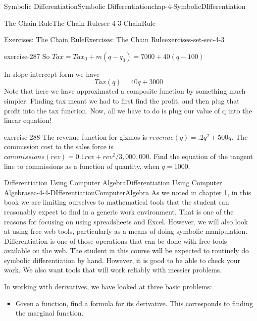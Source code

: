 \documentclass[oneside,10pt,]{book}
\numberwithin{equation}{section}
\begin{document}
\begin{chapterptx}{Symbolic Differentiation}{}{Symbolic Differentiation}{}{}{chap-4-SymbolicDIfferentiation}
\begin{sectionptx}{The Chain Rule}{}{The Chain Rule}{}{}{sec-4-3-ChainRule}
\begin{exercises-subsection-numberless}{Exercises: The Chain Rule}{}{Exercises: The Chain Rule}{}{}{exercises-set-sec-4-3}
\begin{divisionexercise}{19}{}{}{exercise-287}
\hypertarget{p-1692}{}%
So \(Tax=Tax_0+m(q-q_0 )= 7000+40(q-100)\)%
\par
\hypertarget{p-1693}{}%
In slope-intercept form we have%
%
\begin{equation*}
Tax(q)=40q+3000
\end{equation*}
\hypertarget{p-1694}{}%
Note that here we have approximated a composite function by something much simpler. Finding tax meant we had to first find the profit, and then plug that profit into the tax function. Now, all we have to do is plug our value of q into the linear equation!%
\end{divisionexercise}%
\begin{divisionexercise}{20}{}{}{exercise-288}%
\hypertarget{p-1695}{}%
The revenue function for gizmos is \(revenue(q)=.2q^2+500q\).  The commission cost to the sales force is \(commissions(rev)=0.1rev+rev^2/3,000,000\).  Find the equation of the tangent line to commissions as a  function of quantity, when  \(q=1000\).%
\end{divisionexercise}%
\end{exercises-subsection-numberless}
\end{sectionptx}
%
%
\typeout{************************************************}
\typeout{************************************************}
%
\begin{sectionptx}{Differentiation Using Computer Algebra}{}{Differentiation Using Computer Algebra}{}{}{sec-4-4-DIfferentiationComputerAlgebra}
\hypertarget{p-1696}{}%
As we noted in chapter 1, in this book we are limiting ourselves to mathematical tools that the student can reasonably expect to find in a generic work environment.  That is one of the reasons for focusing on using spreadsheets and Excel.  However, we will also look at using free web tools, particularly as a means of doing symbolic manipulation.  Differentiation is one of those operations that can be done with free tools available on the web.  The student in this course will be expected to routinely do symbolic differentiation by hand.  However, it is good to be able to check your work.  We also want tools that will work reliably with messier problems.%
\par
\hypertarget{p-1697}{}%
In working with derivatives, we have looked at three basic problems:%
\leavevmode%
\begin{itemize}[label=\textbullet]
\item{}\hypertarget{p-1698}{}%
Given a function, find a formula for its derivative.  This corresponds to finding the marginal function.%

\end{itemize}
\end{sectionptx}
\end{chapterptx}
\end{document}
